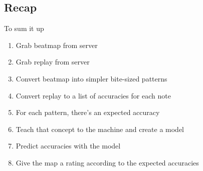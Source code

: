 \documentclass{article}
\begin{document}
\subsection{Recap}

To sum it up

\begin{enumerate}
	\item Grab beatmap from server
	\item Grab replay from server
	\item Convert beatmap into simpler bite-sized patterns
	\item Convert replay to a list of accuracies for each note
	\item For each pattern, there's an expected accuracy
	\item Teach that concept to the machine and create a model
	\item Predict accuracies with the model
	\item Give the map a rating according to the expected accuracies
\end{enumerate}
\end{document}
